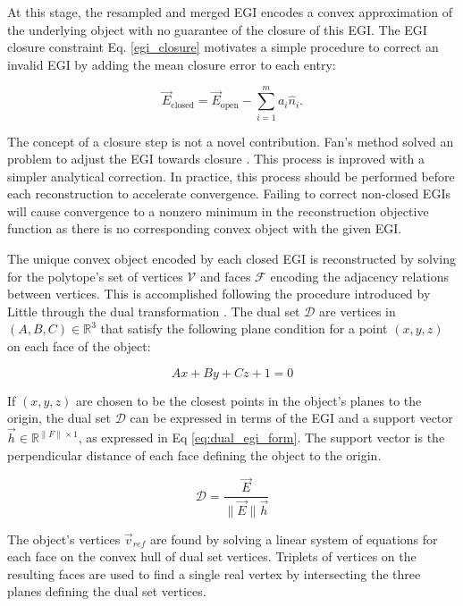 At this stage, the resampled and merged EGI encodes a convex approximation of the underlying object with no guarantee of the closure of this EGI. The EGI closure constraint Eq. \ref{egi_closure} motivates a simple procedure to correct an invalid EGI by adding the mean closure error to each entry:

\begin{equation} \label{egi_validation}
  \vec{E}_{\textrm{closed}} = \vec{E}_{\textrm{open}} - \sum_{i=1}^m a_i \hat{n}_i .
\end{equation}

The concept of a closure step is not a novel contribution. Fan's method solved an problem to adjust the EGI towards closure \cite{fan2020thesis}. This process is inproved with a simpler analytical correction. In practice, this process should be performed before each reconstruction to accelerate convergence. Failing to correct non-closed EGIs will cause convergence to a nonzero minimum in the reconstruction objective function as there is no corresponding convex object with the given EGI.

The unique convex object encoded by each closed EGI is reconstructed by solving for the polytope's set of vertices $\mathcal{V}$ and faces $\mathcal{F}$ encoding the adjacency relations between vertices. This is accomplished following the procedure introduced by Little through the dual transformation \cite{little1983}. The dual set $\mathcal{D}$ are vertices in $(A, B, C) \in \mathbb{R}^3$ that satisfy the following plane condition for a point $(x, y, z)$ on each face of the object:

\begin{equation} \label{dual_abc_form}
  Ax + By + Cz + 1 = 0
\end{equation}

If $(x, y, z)$ are chosen to be the closest points in the object's planes to the origin, the dual set $\mathcal{D}$ can be expressed in terms of the EGI and a support vector $\vec{h} \in \mathbb{R}^{\|F\| \times 1}$, as expressed in Eq \ref{eq:dual_egi_form}. The support vector is the perpendicular distance of each face defining the object to the origin.

\begin{equation} \label{eq:dual_egi_form}
  \mathcal{D} = \frac{\vec{E}}{ \| \vec{E} \| \vec{h}}
\end{equation}

The object's vertices $\vec{v}_{ref}$ are found by solving a linear system of equations for each face on the convex hull of dual set vertices. Triplets of vertices on the resulting faces are used to find a single real vertex by intersecting the three planes defining the dual set vertices.

